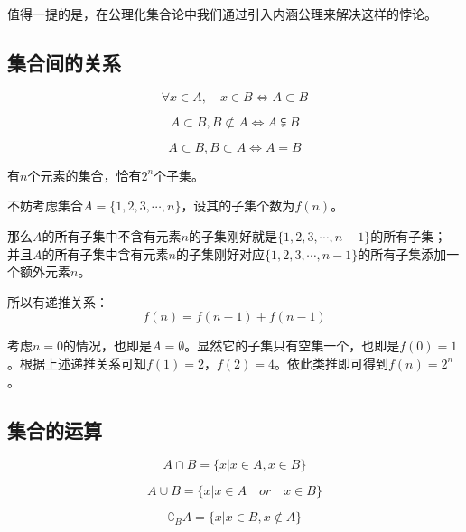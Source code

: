 值得一提的是，在公理化集合论中我们通过引入内涵公理来解决这样的悖论。

\subsection{集合间的关系}

\begin{definition}[包含（子集）]
    $$\forall x \in A ,\quad x \in B \iff A\subset B$$
\end{definition}

\begin{definition}
    $$A\subset B, B \not\subset A \iff A \subsetneqq B$$
\end{definition}

\begin{definition}[相等]
    $$A\subset B, B\subset A \iff A=B$$
\end{definition}

\begin{exercise}[子集个数]
    有$n$个元素的集合，恰有$2^n$个子集。
\end{exercise}

\begin{solution}
    不妨考虑集合$A=\{1,2,3,\cdots,n\}$，设其的子集个数为$f(n)$。

    那么$A$的所有子集中不含有元素$n$的子集刚好就是$\{1,2,3,\cdots,n-1\}$的所有子集；
    并且$A$的所有子集中含有元素$n$的子集刚好对应$\{1,2,3,\cdots,n-1\}$的所有子集添加一个额外元素$n$。

    所以有递推关系：$$f(n)=f(n-1)+f(n-1) $$

    考虑$n=0$的情况，也即是$A=\emptyset$。显然它的子集只有空集一个，也即是$f(0)=1$。根据上述递推关系可知$f(1)=2$，$f(2)=4$。依此类推即可得到$f(n)=2^n$。
\end{solution}

\subsection{集合的运算}

\begin{definition}[交]
    $$A\cap B = \{x|x \in A, x \in B\}$$
\end{definition}

\begin{definition}[并]
    $$A\cup B = \{x|x \in A \quad or \quad x \in B\}$$
\end{definition}

\begin{definition}[补]
    $$\complement_B A=\{x|x\in B, x\notin A\}$$
\end{definition}

